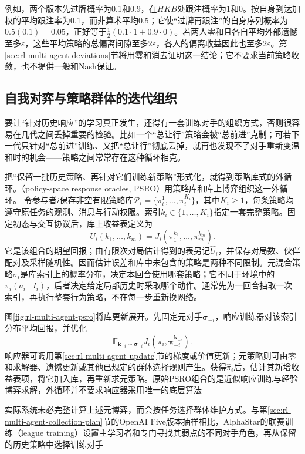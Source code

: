 例如，两个版本先过牌概率为0.1和0.9，在$HKB$处跟注概率为1和0。按自身到达加权的平均跟注率为0.1，而非算术平均0.5；它使“过牌再跟注”的自身序列概率为$0.5(0.1)=0.05$，正好等于$\tfrac12(0.1\cdot1+0.9\cdot0)$。若两人零和且各自平均外部遗憾至多$\varepsilon$，这些平均策略的总偏离间隙至多$2\varepsilon$，各人的偏离收益因此也至多$2\varepsilon$。第\ref{sec:rl-multi-agent-deviations}节将用零和消去证明这一结论；它不要求当前策略收敛，也不提供一般和Nash保证。

\subsection{自我对弈与策略群体的迭代组织}
\label{sec:rl-multi-agent-population}

要让“针对历史响应”的学习真正发生，还得有一套训练对手的组织方式，否则很容易在几代之间丢掉重要的检验。比如一个“总让行”策略会被“总前进”克制；可若下一代只针对“总前进”训练、又把“总让行”彻底丢掉，就再也发现不了对手重新变温和时的机会——策略之间常常存在这种循环相克。

把“保留一批历史策略、再针对它们训练新策略”形式化，就得到策略库式的外循环。（policy-space response oracles, PSRO）用策略库和库上博弈组织这一外循环。
令参与者$i$保存非空有限策略库$\mathcal P_i=\{\pi_i^1,\ldots,\pi_i^{K_i}\}$，其中$K_i\geq1$，每条策略均遵守原任务的观测、消息与行动权限。索引$k_i\in\{1,\ldots,K_i\}$指定一套完整策略。固定初态与交互协议后，库上收益表定义为
\[
 U_i(k_1,\ldots,k_m)
 =J_i(\pi_1^{k_1},\ldots,\pi_m^{k_m}).
\]
它是该组合的期望回报；由有限次对局估计得到的表另记$\widehat U_i$，并保存对局数、伙伴配对及采样随机性。因而估计误差和库中未包含的策略是两种不同限制。元混合策略$\sigma_i$是库索引上的概率分布，决定本回合使用哪套策略；它不同于环境中的$\pi_i(a_i\mid I_i)$，后者决定给定局部历史时采取哪个动作。通常先为一回合抽取一次索引，再执行整套行为策略，不在每一步重新换网络。

图\ref{fig:rl-multi-agent-psro}将库更新展开。先固定元对手$\bm\sigma_{-i}$，响应训练器对该索引分布平均回报，并优化
\[
 \mathbb E_{\bm k_{-i}\sim\bm\sigma_{-i}}
       J_i(\pi_i,\bm\pi_{-i}^{\bm k_{-i}}).
\]
响应器可调用第\ref{sec:rl-multi-agent-update}节的梯度或价值更新；元策略则可由零和求解器、遗憾更新或其他已规定的群体选择规则产生。获得$\hat\pi_i$后，估计其新增收益表项，将它加入库，再重新求元策略。原始PSRO组合的是近似响应训练与经验博弈求解，外循环并不要求响应器采用唯一的底层算法

实际系统未必完整计算上述元博弈，而会按任务选择群体维护方式。与第\ref{sec:rl-multi-agent-collection-plan}节的OpenAI Five版本抽样相比，AlphaStar的联赛训练（league training）设置主学习者和专门寻找其弱点的不同对手角色，再从保留的历史策略中选择训练对手

